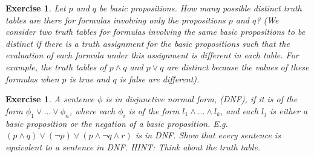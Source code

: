 \documentclass{article}
\theoremstyle{plain}
\newtheorem{Q}[theorem]{Exercise}{\bfseries}{\upshape}
\begin{document}
\begin{Q}
Let $p$ and $q$ be basic propositions. How many possible distinct truth tables are there for formulas involving only the propositions $p$ and $q$? (We consider two truth tables for formulas involving the same basic propositions to be distinct if there is a truth assignment for the basic propositions such that the evaluation of each formula under this assignment is different in each table. For example, the truth tables of $p\wedge q$ and $p\vee q$ are distinct because the values of these formulas when $p$ is true and $q$ is false are different).
\end{Q}
\begin{comment}
\textbf{Solution:} 
There are 4 rows in each truth table for $p$ and $q$.

{\centering
\begin{tabular}{ c c c }
 $p$ & $q$ & $\phi$ \\ \hline 
 T & T & ?  \\  
 T & F & ?  \\
 F & T & ?  \\
 F & F & ?  
\end{tabular}\par}

Here each ? can be true or false. This gives $2^4 = 16$ distinct possibilities.
\end{comment}

\begin{Q}
A sentence $\phi$ is in \emph{disjunctive normal form}, (DNF), if it is of the form $\phi_1\vee\ldots\vee \phi_n$, where each $\phi_i$ is of the form $l_1\wedge\ldots\wedge l_k$, and each $l_j$ is either a basic proposition or the negation of a basic proposition. E.g. $(p\wedge q)\vee (\neg p)\vee (p\wedge \neg q \wedge r)$ is in DNF. Show that every sentence is equivalent to a sentence in DNF. HINT: Think about the truth table.
\end{Q}
\begin{comment}
\textbf{Solution:} 
Consider this example. Suppose $\phi$ contains only the proposition symbols $p,q,r$, and that its truth table is as follows:

{\centering
\begin{tabular}{ c c c c }
 $p$ & $q$ & $r$ & $\phi$ \\ \hline 
 T & T & T & T  \\  
 T & T & F & F  \\
 T & F & T & F  \\
 T & F & F & F  \\
 F & T & T & T  \\  
 F & T & F & T  \\
 F & F & T & F  \\
 F & F & F & F  \\
\end{tabular}\par}
 Then $\phi$ is obviously logically equivalent to $(p\wedge q \wedge r) \vee (\neg p\wedge q \wedge r) \vee (\neg p \wedge q \wedge \neg r)$, which is a DNF sentence. This method obviously generalizes. If $\phi$ is a contradiction, i.e. if all rows in the truth table are $F$, then $\phi$ is equivalent to e.g. $p\wedge \neg p$.
\end{comment}
\end{document}
